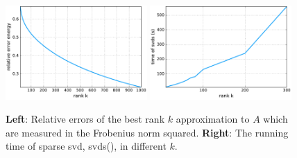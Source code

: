 \begin{figure}[!ht]
	\centering
	\includegraphics[width=0.48\textwidth]{fig/ranks.pdf}
    \hskip 0.2cm
	\includegraphics[width=0.48\textwidth]{fig/ranks_time.pdf}
	\caption{\small
  		\textbf{Left}: Relative errors of the best rank $k$ approximation to $A$
          which are measured in the Frobenius norm squared.
        \textbf{Right}: The running time of sparse svd, svds(), in different $k$.}
	\label{fig:rank}
\end{figure}
